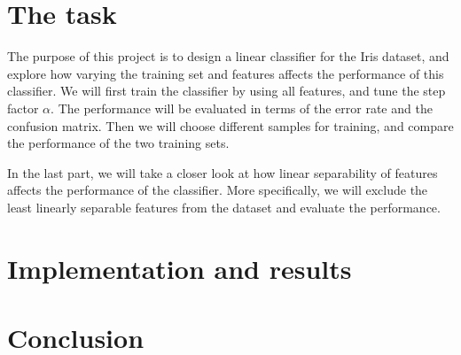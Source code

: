 \documentclass{article}
\begin{document}
\section{The task}

The purpose of this project is to design a linear classifier for the Iris dataset,
and explore how varying the training set and features affects the performance of
this classifier. We will first train the classifier by using all features, and tune
the step factor $\alpha$. The performance will be evaluated in terms of the error
rate and the confusion matrix. Then we will choose different samples for training,
and compare the performance of the two training sets.

In the last part, we will take a closer look at how linear separability of features
affects the performance of the classifier. More specifically, we will exclude the
least linearly separable features from the dataset and evaluate the performance.

\section{Implementation and results}

\section{Conclusion}
\end{document}
